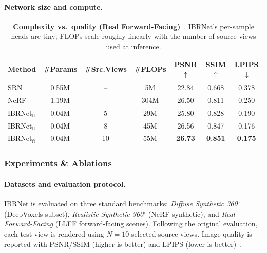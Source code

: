 \begin{enrichment}
\begin{enrichment}
     \paragraph{Network size and compute.}
     \begin{table}[H]
         \centering
         \begin{tabular}{l|c|c|c|c|c|c}
             \hline
             Method & \#Params & \#Src.Views & \#FLOPs & PSNR$\uparrow$ & SSIM$\uparrow$ & LPIPS$\downarrow$ \\
             \hline
             SRN & 0.55M & -- & 5M & 22.84 & 0.668 & 0.378 \\
             NeRF~\cite{mildenhall2020_nerf} & 1.19M & -- & 304M & 26.50 & 0.811 & 0.250 \\
             \hline
             IBRNet$_{\mathrm{ft}}$ & 0.04M & 5  & 29M & 25.80 & 0.828 & 0.190 \\
             IBRNet$_{\mathrm{ft}}$ & 0.04M & 8  & 45M & 26.56 & 0.847 & 0.176 \\
             IBRNet$_{\mathrm{ft}}$ & 0.04M & 10 & 55M & \textbf{26.73} & \textbf{0.851} & \textbf{0.175} \\
             \hline
         \end{tabular}
         \caption{\textbf{Complexity vs.\ quality (Real Forward-Facing)}~\cite{wang2021_ibrnet}. IBRNet's per-sample heads are tiny; FLOPs scale roughly linearly with the number of source views used at inference.}
         \label{tab:chapter23_ibrnet_complexity}
     \end{table}
     
     \subsubsection{Experiments \& Ablations}
     \label{subsec:chapter23_ibrnet_experiments}
     
     \paragraph{Datasets and evaluation protocol.}
     IBRNet is evaluated on three standard benchmarks: \emph{Diffuse Synthetic 360$^\circ$} (DeepVoxels subset), \emph{Realistic Synthetic 360$^\circ$} (NeRF synthetic), and \emph{Real Forward-Facing} (LLFF forward-facing scenes). Following the original evaluation, each test view is rendered using $N{=}10$ selected source views. Image quality is reported with PSNR/SSIM (higher is better) and LPIPS (lower is better)~\cite{wang2021_ibrnet}.
     

\end{enrichment}
\end{enrichment}
